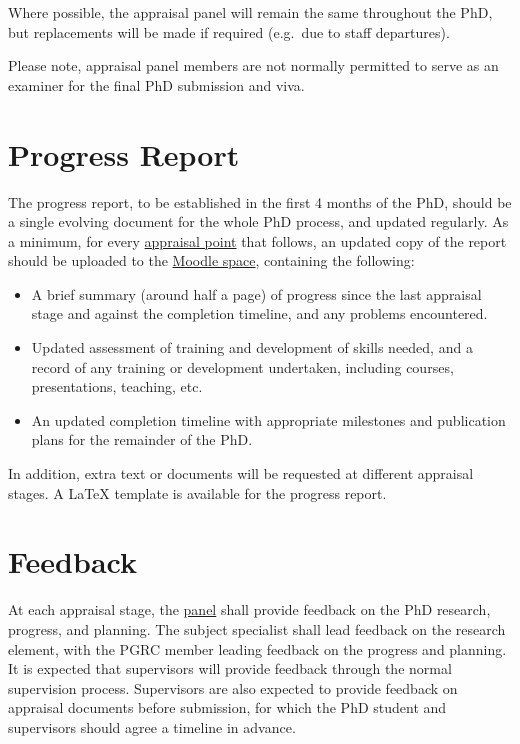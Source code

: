 \documentclass[12pt,a4paper]{article}
\begin{document}
Where possible, the appraisal panel will remain the same throughout the PhD, but replacements will be made if required (e.g.\ due to staff departures).

Please note, appraisal panel members are not normally permitted to serve as an examiner for the final PhD submission and viva.


\section{Progress Report} \label{sec:report}
The progress report, to be established in the first 4 months of the PhD, should be a single evolving document for the whole PhD process, and updated regularly. As a minimum, for every \hyperref[sec:points]{appraisal point} that follows, an updated copy of the report should be uploaded to the \href{https://modules.lancaster.ac.uk/course/view.php?id=7050}{Moodle space}, containing the following:
\begin{itemize}
	\item A brief summary (around half a page) of progress since the last appraisal stage and against the completion timeline, and any problems encountered.
	\item Updated assessment of training and development of skills needed, and a record of any training or development undertaken, including courses, presentations, teaching, etc.\
	\item An updated completion timeline with appropriate milestones and publication plans for the remainder of the PhD.
\end{itemize}

In addition, extra text or documents will be requested at different appraisal stages. A \LaTeX{} template is available for the progress report.


\section{Feedback} \label{sec:feedback}
At each appraisal stage, the \hyperref[sec:panel]{panel} shall provide feedback on the PhD research, progress, and planning. The subject specialist shall lead feedback on the research element, with the PGRC member leading feedback on the progress and planning. It is expected that supervisors will provide feedback through the normal supervision process. Supervisors are also expected to provide feedback on appraisal documents before submission, for which the PhD student and supervisors should agree a timeline in advance.
\end{document}
